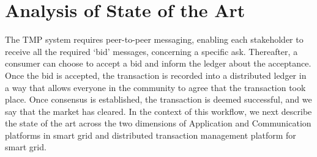 \documentclass[sigplan]{acmart}
\newcommand{\Abhishek}[1]{\todo[color=yellow!50, linecolor=black!50]{\textbf{Abhishek}: #1}}
\newcommand{\Karla}[1]{\todo[color=green!50, linecolor=black!50]{\textbf{Karla}: #1}}
\newcommand{\Aron}[1]{\todo[color=blue!30, linecolor=black!50]{\textbf{Aron}: #1}}
\begin{document}









\section{Analysis of State of the Art}
\label{sec:related}
The TMP system requires peer-to-peer messaging, enabling each stakeholder to receive all the required `bid' messages, concerning a specific ask. %
Thereafter, a consumer can choose to accept a bid and inform the ledger about the acceptance.  
Once the bid is accepted, the transaction is recorded into a distributed ledger in a way that allows everyone in the community to agree that the transaction took place. Once consensus is established, the transaction is deemed successful, and we  say that the market has cleared. In the context of this workflow, we next describe the state of the art across the two dimensions of Application and Communication platforms in smart grid and distributed transaction management platform for smart grid.
\end{document}

